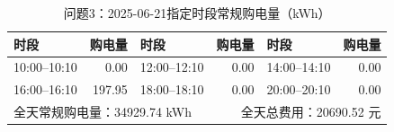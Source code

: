 \begin{table}[H]\centering\small
\caption{问题3：2025-06-21指定时段常规购电量（kWh）}
\label{tab:q3_0621_purchase}
\begin{tabular}{lrlrlr}\toprule
时段 & 购电量 & 时段 & 购电量 & 时段 & 购电量 \\\midrule
10:00--10:10 & 0.00 & 12:00--12:10 & 0.00 & 14:00--14:10 & 0.00 \\
16:00--16:10 & 197.95 & 18:00--18:10 & 0.00 & 20:00--20:10 & 0.00 \\
\midrule
\multicolumn{3}{l}{全天常规购电量：34929.74 kWh} & \multicolumn{3}{r}{全天总费用：20690.52 元}\\
\bottomrule\end{tabular}\end{table}
